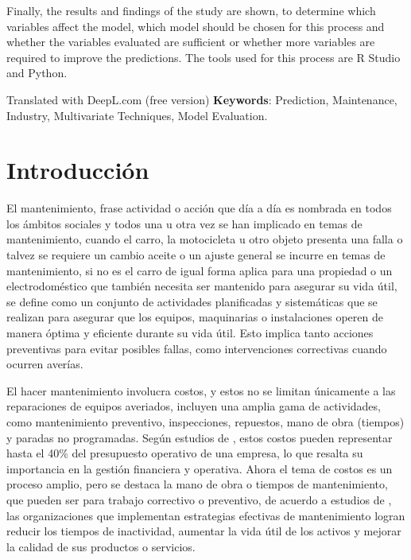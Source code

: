 \documentclass[
  11pt,
  bookmarksnumbered]{article}
\begin{document}
Finally, the results and findings of the study are shown, to determine which variables affect the model, which model should be chosen for this process and whether the variables evaluated are sufficient or whether more variables are required to improve the predictions. The tools used for this process are R Studio and Python.

Translated with DeepL.com (free version)
\textbf{Keywords}: Prediction, Maintenance, Industry, Multivariate Techniques, Model Evaluation.

\newpage

\hypertarget{introducciuxf3n}{%
\section{Introducción}\label{introducciuxf3n}}

El mantenimiento, frase actividad o acción que día a día es nombrada en todos los ámbitos sociales y todos una u otra vez se han implicado en temas de mantenimiento, cuando el carro, la motocicleta u otro objeto presenta una falla o talvez se requiere un cambio aceite o un ajuste general se incurre en temas de mantenimiento, si no es el carro de igual forma aplica para una propiedad o un electrodoméstico que también necesita ser mantenido para asegurar su vida útil, se define como un conjunto de actividades planificadas y sistemáticas que se realizan para asegurar que los equipos, maquinarias o instalaciones operen de manera óptima y eficiente durante su vida útil.
Esto implica tanto acciones preventivas para evitar posibles fallas, como intervenciones correctivas cuando ocurren averías.

El hacer mantenimiento involucra costos, y estos no se limitan únicamente a las reparaciones de equipos averiados, incluyen una amplia gama de actividades, como mantenimiento preventivo, inspecciones, repuestos, mano de obra (tiempos) y paradas no programadas.
Según estudios de \textcite{Garcia2017}, estos costos pueden representar hasta el 40\% del presupuesto operativo de una empresa, lo que resalta su importancia en la gestión financiera y operativa.
Ahora el tema de costos es un proceso amplio, pero se destaca la mano de obra o tiempos de mantenimiento, que pueden ser para trabajo correctivo o preventivo, de acuerdo a estudios de \textcite{Martinez2020}, las organizaciones que implementan estrategias efectivas de mantenimiento logran reducir los tiempos de inactividad, aumentar la vida útil de los activos y mejorar la calidad de sus productos o servicios.
\end{document}
